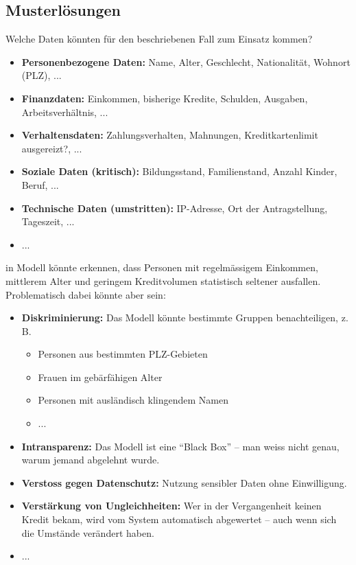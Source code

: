 \subsection*{Musterlösungen}

\begin{aufgabe}{1}

Welche Daten könnten für den beschriebenen Fall zum Einsatz kommen?

\begin{itemize}
  \item \textbf{Personenbezogene Daten:} Name, Alter, Geschlecht, Nationalität, Wohnort (PLZ), ...
  \item \textbf{Finanzdaten:} Einkommen, bisherige Kredite, Schulden, Ausgaben, Arbeitsverhältnis, ...
  \item \textbf{Verhaltensdaten:} Zahlungsverhalten, Mahnungen, Kreditkartenlimit ausgereizt?, ...
  \item \textbf{Soziale Daten (kritisch):} Bildungsstand, Familienstand, Anzahl Kinder, Beruf, ...
  \item \textbf{Technische Daten (umstritten):} IP-Adresse, Ort der Antragstellung, Tageszeit, ...
  \item ...
\end{itemize}

in Modell könnte erkennen, dass Personen mit regelmässigem Einkommen, mittlerem Alter und geringem Kreditvolumen statistisch seltener ausfallen. Problematisch dabei könnte aber sein:

\begin{itemize}
  \item \textbf{Diskriminierung:} Das Modell könnte bestimmte Gruppen benachteiligen, z.\,B.\:
  \begin{itemize}
    \item Personen aus bestimmten PLZ-Gebieten
    \item Frauen im gebärfähigen Alter
    \item Personen mit ausländisch klingendem Namen
    \item ...
  \end{itemize}

  \item \textbf{Intransparenz:} Das Modell ist eine ``Black Box'' – man weiss nicht genau, warum jemand abgelehnt wurde.

  \item \textbf{Verstoss gegen Datenschutz:} Nutzung sensibler Daten ohne Einwilligung.

  \item \textbf{Verstärkung von Ungleichheiten:} Wer in der Vergangenheit keinen Kredit bekam, wird vom System automatisch abgewertet – auch wenn sich die Umstände verändert haben.
  \item ...


\end{itemize}
\end{aufgabe}
